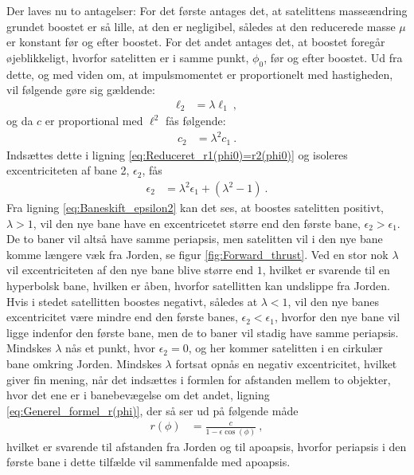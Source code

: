 \noindent
Der laves nu to antagelser: For det første antages det, at satelittens masseændring grundet boostet er så lille, at den er negligibel, således at den reducerede masse $\mu$ er konstant før og efter boostet. For det andet antages det, at boostet foregår øjeblikkeligt, hvorfor satelitten er i samme punkt, $\phi_0$, før og efter boostet. Ud fra dette, og med viden om, at impulsmomentet er proportionelt med hastigheden, vil følgende gøre sig gældende:
\begin{align}
	\ell_2 &= \lambda \ell_1 \: ,
\end{align}
og da $c$ er proportional med $\ell^2$ fås følgende:
\begin{align} \label{eq:Baneskift_c2}
	c_2 &= \lambda^2 c_1 \: .
\end{align}
Indsættes dette i ligning \eqref{eq:Reduceret_r1(phi0)=r2(phi0)} og isoleres excentriciteten af bane 2, $\epsilon_2$, fås
\begin{align} \label{eq:Baneskift_epsilon2}
	\epsilon_2 &= \lambda^2\epsilon_1+(\lambda^2-1) \: .
\end{align}
%
Fra ligning \eqref{eq:Baneskift_epsilon2} kan det ses, at boostes satelitten positivt, $\lambda > 1$, vil den nye bane have en excentricetet større end den første bane, $\epsilon_2 > \epsilon_1$. De to baner vil altså have samme periapsis, men satelitten vil i den nye bane komme længere væk fra Jorden, se figur \ref{fig:Forward_thrust}. Ved en stor nok $\lambda$ vil excentriciteten af den nye bane blive større end $1$, hvilket er svarende til en hyperbolsk bane, hvilken er åben, hvorfor satellitten kan undslippe fra Jorden. \\
Hvis i stedet satellitten boostes negativt, således at $\lambda < 1$, vil den nye banes excentricitet være mindre end den første banes, $\epsilon_2 < \epsilon_1$, hvorfor den nye bane vil ligge indenfor den første bane, men de to baner vil stadig have samme periapsis. \\
Mindskes $\lambda$ nås et punkt, hvor $\epsilon_2 = 0$, og her kommer satelitten i en cirkulær bane omkring Jorden. Mindskes $\lambda$ fortsat opnås en negativ excentricitet, hvilket giver fin mening, når det indsættes i formlen for afstanden mellem to objekter, hvor det ene er i banebevægelse om det andet, ligning \eqref{eq:Generel_formel_r(phi)}, der så ser ud på følgende måde
\begin{align}
	r(\phi) &= \frac{c}{1-\epsilon\cos(\phi)} \: ,
\end{align}
hvilket er svarende til afstanden fra Jorden og til apoapsis, hvorfor periapsis i den første bane i dette tilfælde vil sammenfalde med apoapsis.